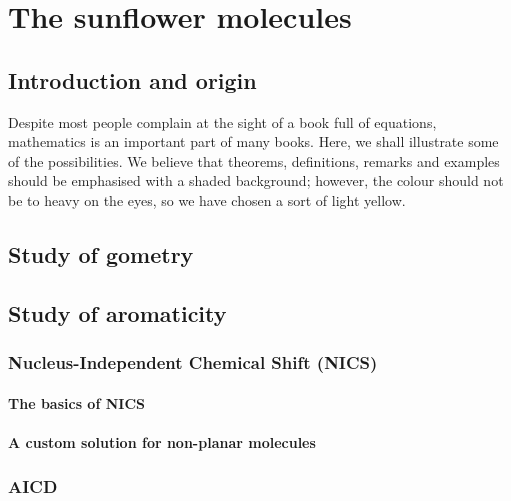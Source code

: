 \setchapterpreamble[u]{\margintoc}
\chapter{The sunflower molecules}


\section{Introduction and origin}

\blindtext

Despite most people complain at the sight of a book full of equations,
mathematics is an important part of many books. Here, we shall
illustrate some of the possibilities. We believe that theorems,
definitions, remarks and examples should be emphasised with a shaded
background; however, the colour should not be to heavy on the eyes, so
we have chosen a sort of light yellow.


\section{Study of gometry}

\blindtext


\section{Study of aromaticity}

\subsection{Nucleus-Independent Chemical Shift (NICS)}
\blindtext
\subsubsection{The basics of NICS}
\blindtext
\subsubsection{A custom solution for non-planar molecules}
\blindtext

\subsection{AICD}
